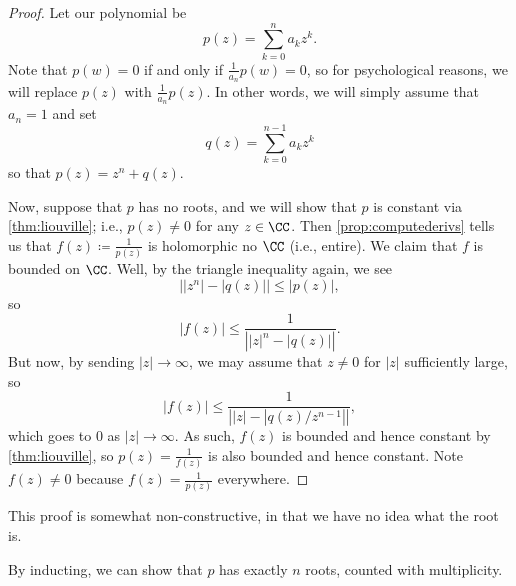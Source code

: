 \begin{proof}
	Let our polynomial be
	\[p(z)=\sum_{k=0}^na_kz^k.\]
	Note that $p(w)=0$ if and only if $\frac1{a_n}p(w)=0$, so for psychological reasons, we will replace $p(z)$ with $\frac1{a_n}p(z)$. In other words, we will simply assume that $a_n=1$ and set
	\[q(z)=\sum_{k=0}^{n-1}a_kz^k\]
	so that $p(z)=z^n+q(z)$.

	Now, suppose that $p$ has no roots, and we will show that $p$ is constant via \autoref{thm:liouville}; i.e., $p(z)\ne0$ for any $z\in\CC$. Then \autoref{prop:computederivs} tells us that $f(z)\coloneqq \frac1{p(z)}$ is holomorphic no $\CC$ (i.e., entire). We claim that $f$ is bounded on $\CC$. Well, by the triangle inequality again, we see
	\[\left|\left|z^n\right|-|q(z)|\right|\le|p(z)|,\]
	so
	\[\left|f(z)\right|\le\frac1{\left||z|^n-|q(z)|\right|}.\]
	But now, by sending $|z|\to\infty$, we may assume that $z\ne0$ for $|z|$ sufficiently large, so
	\[\left|f(z)\right|\le\frac1{\left||z|-|q(z)/z^{n-1}|\right|},\]
	which goes to $0$ as $|z|\to\infty$. As such, $f(z)$ is bounded and hence constant by \autoref{thm:liouville}, so $p(z)=\frac1{f(z)}$ is also bounded and hence constant. Note $f(z)\ne0$ because $f(z)=\frac1{p(z)}$ everywhere.
\end{proof}
\begin{remark}
	This proof is somewhat non-constructive, in that we have no idea what the root is.
\end{remark}
\begin{remark}
	By inducting, we can show that $p$ has exactly $n$ roots, counted with multiplicity.
\end{remark}

